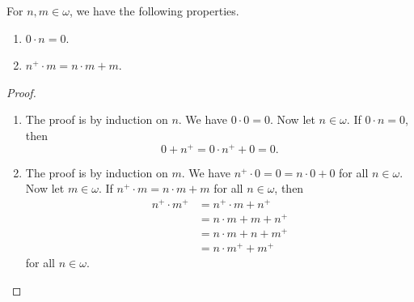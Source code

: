 \begin{lemma}
  For $n, m \in \omega$, we have the following properties.
  \begin{enumerate}
    \item $0 \cdot n = 0$.
    \item $n^+ \cdot m = n \cdot m + m$.
  \end{enumerate}
\end{lemma}
\begin{proof}
  \leavevmode
  \begin{enumerate}
    \item The proof is by induction on $n$.
    We have $0 \cdot 0 = 0$.
    Now let $n \in \omega$.
    If $0 \cdot n = 0$, then
    \begin{equation*}
      0 + n^+ = 0 \cdot n^+ + 0 = 0.
    \end{equation*}
    \item The proof is by induction on $m$.
    We have $n^+ \cdot 0 = 0 = n \cdot 0 + 0$ for all $n \in \omega$.
    Now let $m \in \omega$.
    If $n^+ \cdot m = n \cdot m + m$ for all $n \in \omega$, then
    \begin{align*}
      n^+ \cdot m^+
      &= n^+ \cdot m + n^+ \\
      &= n \cdot m + m + n^+ \\
      &= n \cdot m + n + m^+ \\
      &= n \cdot m^+ + m^+
    \end{align*}
    for all $n \in \omega$.
    \qedhere
  \end{enumerate}
\end{proof}

